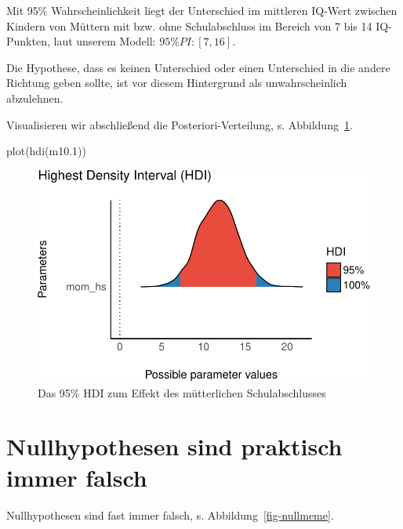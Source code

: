 \documentclass[
  a4paper,
  DIV=11]{scrreprt}
\newenvironment{Shaded}{\begin{snugshade}}{\end{snugshade}}
\newcommand{\FloatTok}[1]{\textcolor[rgb]{0.68,0.00,0.00}{#1}}
\newcommand{\FunctionTok}[1]{\textcolor[rgb]{0.28,0.35,0.67}{#1}}
\newcommand{\NormalTok}[1]{\textcolor[rgb]{0.00,0.23,0.31}{#1}}
\theoremstyle{definition}
\theoremstyle{remark}
\begin{document}
Mit 95\% Wahrscheinlichkeit liegt der Unterschied im mittleren IQ-Wert
zwischen Kindern von Müttern mit bzw. ohne Schulabschluss im Bereich von
7 bis 14 IQ-Punkten, laut unserem Modell: \(95\%PI: [7,16]\).

Die Hypothese, dass es keinen Unterschied oder einen Unterschied in die
andere Richtung geben sollte, ist vor diesem Hintergrund als
unwahrscheinlich abzulehnen.

Visualisieren wir abschließend die Posteriori-Verteilung, s.
Abbildung~\ref{fig-m101hdi}.

\begin{Shaded}
\begin{Highlighting}[]
\FunctionTok{plot}\NormalTok{(}\FunctionTok{hdi}\NormalTok{(m10}\FloatTok{.1}\NormalTok{))}
\end{Highlighting}
\end{Shaded}

\begin{figure}[H]

{\centering \includegraphics{./metrische-AV_files/figure-pdf/fig-m101hdi-1.pdf}

}

\caption{\label{fig-m101hdi}Das 95\% HDI zum Effekt des mütterlichen
Schulabschlusses}

\end{figure}

\hypertarget{nullhypothesen-sind-praktisch-immer-falsch}{%
\section{Nullhypothesen sind praktisch immer
falsch}\label{nullhypothesen-sind-praktisch-immer-falsch}}

Nullhypothesen sind fast immer falsch, s. Abbildung~\ref{fig-nullmeme}.
\end{document}
